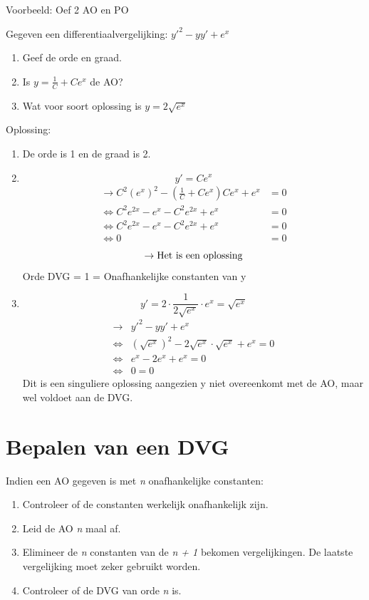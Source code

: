 \documentclass[12pt]{report}
\newcommand{\example}[2]{
      \hrulefill
      
      Voorbeeld: #1
      
      #2
      
      \hrulefill
}
\begin{document}
\example{Oef 2 AO en PO}
{Gegeven een differentiaalvergelijking: $y'^2 - yy'+e^x$
\begin{enumerate}
 \item Geef de orde en graad.
 \item Is $y = \frac{1}{C} + Ce^x$ de AO?
 \item Wat  voor soort oplossing is $y = 2\sqrt{e^x}$
 \end{enumerate}
Oplossing:
\begin{enumerate}
 \item 
   De orde is 1 en de graad is 2.
 
 \item 
 $$y' = Ce^x$$
 \begin{equation*}
  \begin{split}
   \rightarrow C^2(e^x)^2 - (\frac{1}{C} + Ce^x)Ce^x + e^x &  = 0 \\
   \Leftrightarrow C^2e^{2x} - e^x - C^2e^{2x} + e^x &  = 0 \\
   \Leftrightarrow C^2e^{2x} - e^x - C^2e^{2x} + e^x & = 0 \\
   \Leftrightarrow 0 & =0
  \end{split}
 \end{equation*}
  $$\rightarrow \hbox{Het is een oplossing}$$
  Orde DVG = 1 = Onafhankelijke constanten van y
 
 \item 
 $$ y'  = 2 \cdot \frac{1}{2\sqrt{e^x}} \cdot e^x = \sqrt{e^x}$$
 \begin{equation*}
  \begin{split}
   \rightarrow & y'^2 - yy'+e^x \\
   \Leftrightarrow &  (\sqrt{e^x})^2 - 2\sqrt{e^x}\cdot\sqrt{e^x} + e^x  = 0 \\
   \Leftrightarrow & e^x - 2e^x + e^x  = 0 \\
   \Leftrightarrow & 0 = 0
  \end{split}
 \end{equation*}
  Dit is een singuliere oplossing aangezien y niet overeenkomt met de AO, maar wel voldoet aan de DVG.
 
\end{enumerate}
}
\section{Bepalen van een DVG}
Indien een AO gegeven is met \textit{n} onafhankelijke constanten:
\begin{enumerate}
 \item Controleer of de constanten werkelijk onafhankelijk zijn.
 \item Leid de AO \textit{n} maal af.
 \item Elimineer de \textit{n} constanten van de \textit{n + 1} bekomen vergelijkingen. De laatste vergelijking moet zeker gebruikt worden.
 \item Controleer of de DVG van orde \textit{n} is.
\end{enumerate}
\end{document}
